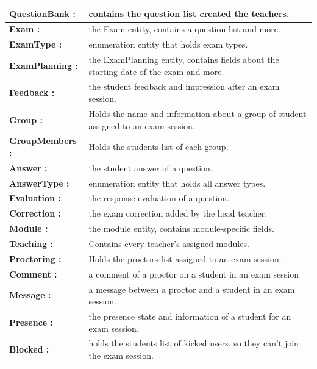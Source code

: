 \documentclass[]{uc2pfecaneva}
\begin{document}
\begin{table}
\begin{tabularx}{\textwidth}{|l|X|}
            \textbf{QuestionBank :} & contains the question list created the teachers.\\ \hline
            \textbf{Exam :} & the Exam entity, contains a question list and more.\\ \hline
            \textbf{ExamType :} & enumeration entity that holds exam types.\\ \hline
            \textbf{ExamPlanning :} & the ExamPlanning entity, contains fields about the starting date of the exam and more.\\ \hline
            \textbf{Feedback :} & the student feedback and impression after an exam session.\\ \hline
            \textbf{Group :} & Holds the name and information about a group of student assigned to an exam session.\\ \hline
            \textbf{GroupMembers :} & Holds the students list of each group.\\ \hline
            \textbf{Answer :} & the student answer of a question.\\ \hline
            \textbf{AnswerType :} & enumeration entity that holds all answer types.\\ \hline
            \textbf{Evaluation :} & the response evaluation of a question.\\ \hline
            \textbf{Correction :} & the exam correction added by the head teacher.\\ \hline
            \textbf{Module :} & the module entity, contains module-specific fields.\\ \hline
            \textbf{Teaching :} & Contains every teacher's assigned modules.\\ \hline
            \textbf{Proctoring :} & Holds the proctors list assigned to an exam session.\\ \hline
            \textbf{Comment :} & a comment of a proctor on a student in an exam session\\ \hline
            \textbf{Message :} & a message between a proctor and a student in an exam session.\\ \hline
            \textbf{Presence :} & the presence state and information of a student for an exam session.\\ \hline
            \textbf{Blocked :} & holds the students list of kicked users, so they can't join the exam session.\\ \hline
        \end{tabularx}
        \label{table:1}
    \end{table}
\end{document}
